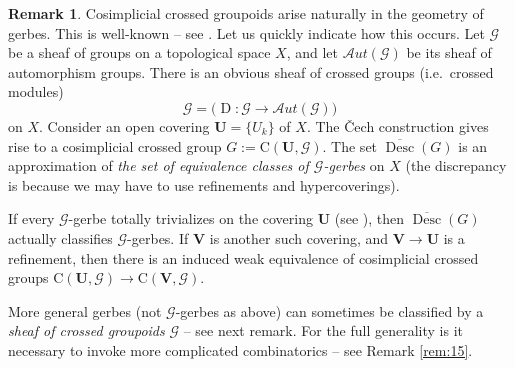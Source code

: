 \documentclass[a4paper,10pt]{amsart}
\theoremstyle{definition}
\newtheorem{rem}[equation]{Remark}
\numberwithin{equation}{section}
\newcommand{\opn}{\operatorname}
\newcommand{\ol}{\overline}
\newcommand{\mcal}[1]{\mathcal{#1}}
\newcommand{\mrm}[1]{\mathrm{#1}}
\newcommand{\bsym}[1]{\boldsymbol{#1}}
\newcommand{\gerbe}[1]{\bsym{\mcal{#1}}}
\begin{document}
\begin{rem} \label{rem:10}
Cosimplicial crossed groupoids arise naturally in the geometry of gerbes. 
This is well-known -- see \cite{Gi, Br1, Br2, BGNT1}. 
Let us quickly indicate how this occurs. Let $\mcal{G}$ be a sheaf of groups on
a topological space $X$, and let $\mcal{A}ut(\mcal{G})$ be its sheaf of
automorphism groups. There is an obvious sheaf of crossed
groups (i.e.\ crossed modules)
\[ \gerbe{G} = \big( \opn{D} : \mcal{G} \to \mcal{A}ut(\mcal{G}) \big)  \] 
on $X$. Consider an open covering $\bsym{U} = \{ U_k \}$ of $X$. 
The \v{C}ech construction gives rise to a cosimplicial crossed group
$G := \mrm{C}(\bsym{U} , \gerbe{G})$.
The set $\ol{\opn{Desc}}(G)$ is an approximation of {\em the set of
equivalence classes of $\mcal{G}$-gerbes} on $X$ (the discrepancy is because we
may have to use refinements and hypercoverings). 

If  every $\mcal{G}$-gerbe totally trivializes on the covering $\bsym{U}$ (see
\cite[Definition 9.16]{Ye1}),
then $\ol{\opn{Desc}}(G)$ actually classifies $\mcal{G}$-gerbes.
If $\bsym{V}$ is another such covering, and 
$\bsym{V} \to \bsym{U}$ is a refinement, then there is an induced 
weak equivalence of cosimplicial crossed groups
$\mrm{C}(\bsym{U} , \gerbe{G}) \to \mrm{C}(\bsym{V} , \gerbe{G})$.

More general gerbes (not $\mcal{G}$-gerbes as above) 
can sometimes be classified by a {\em sheaf of crossed groupoids} 
$\gerbe{G}$ -- see next remark.
For the full generality is it necessary to invoke more complicated
combinatorics -- see Remark \ref{rem:15}.
\end{rem}
\end{document}
